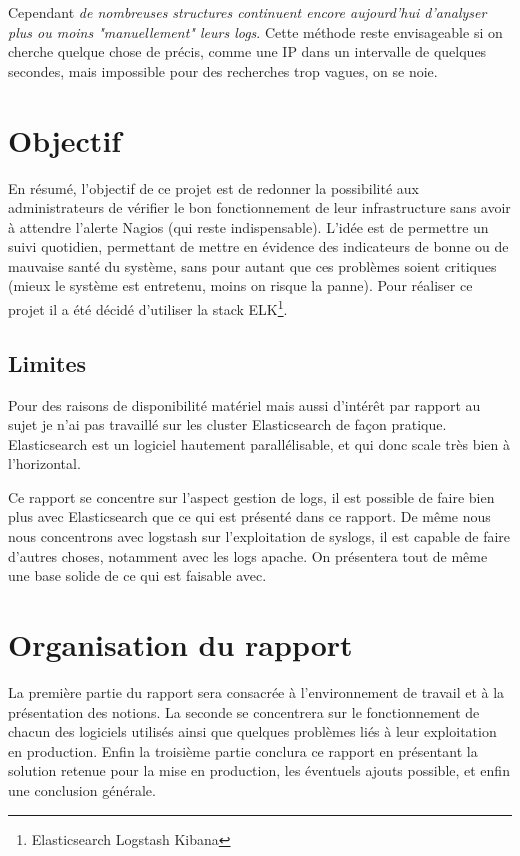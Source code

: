 \documentclass[a4paper,12pt,one side,titlepage]{report}
\begin{document}
Cependant \emph{de nombreuses structures continuent encore aujourd'hui d'analyser 
plus ou moins "manuellement" leurs \emph{\gls{logs}}}. Cette méthode reste envisageable 
si on cherche quelque chose de précis, comme une IP dans un intervalle de quelques 
secondes, mais impossible pour des recherches trop vagues, on se noie.


\section{Objectif}
En résumé, l'objectif de ce projet est de redonner la possibilité aux administrateurs
de vérifier le bon fonctionnement de leur infrastructure sans avoir à attendre l'alerte
Nagios (qui reste indispensable). L'idée est de permettre un suivi quotidien, permettant
de mettre en évidence des indicateurs de bonne ou de mauvaise santé du système, sans 
pour autant que ces problèmes soient critiques (mieux le système est entretenu, moins
on risque la panne).
Pour réaliser ce projet il a été décidé d'utiliser la stack ELK\footnote{Elasticsearch Logstash Kibana}.



\subsection{Limites}
Pour des raisons de disponibilité matériel mais aussi d'intérêt par rapport au sujet
je n'ai pas travaillé sur les cluster Elasticsearch de façon pratique. Elasticsearch
est un logiciel hautement parallélisable, et qui donc scale très bien à l'horizontal. 

Ce rapport se concentre sur l'aspect gestion de logs, il est possible de faire bien
plus avec Elasticsearch que ce qui est présenté dans ce rapport.
De même nous nous concentrons avec logstash sur l'exploitation de syslogs, il est 
capable de faire d'autres choses, notamment avec les logs apache. On présentera 
tout de même une base solide de ce qui est faisable avec.


\section{Organisation du rapport}
La première partie du rapport sera consacrée à l'environnement de travail et à la 
présentation des notions. La seconde se concentrera sur le fonctionnement de chacun 
des logiciels utilisés ainsi que quelques problèmes liés à leur exploitation en production.
Enfin la troisième partie conclura ce rapport en présentant la solution retenue 
pour la mise en production, les éventuels ajouts possible, et enfin une conclusion 
générale.
\end{document}
